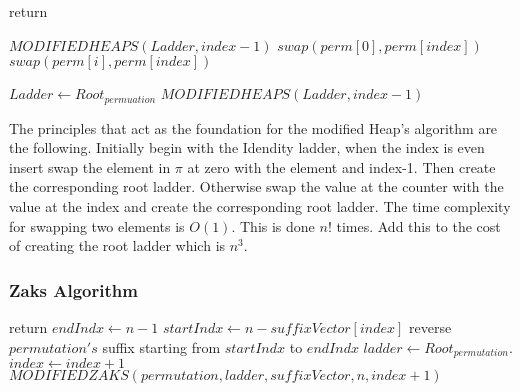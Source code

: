 \begin{algorithm}
  \begin{algorithmic}[1]
        \State return
      \EndIf
        
        $MODIFIEDHEAPS(Ladder, index-1)$
          \State $swap(perm[0], perm[index])$
        \Else 
          \State $swap(perm[i], perm[index])$
          
        \EndIf
        \State $Ladder \gets Root_{permuation}$
      \EndFor
        \State $MODIFIEDHEAPS(Ladder, index-1)$
      \EndIf
    \EndFunction
  \end{algorithmic}
\end{algorithm}
The principles that act as the foundation for the modified Heap's algorithm 
are the following. Initially begin with the Idendity ladder, when the index is 
even insert swap the element in $\pi$ at zero with the element and index-1. Then create the 
corresponding root ladder. Otherwise swap the value at the counter with the value at the 
index and create the corresponding root ladder. The time complexity for swapping two elements 
is $O(1)$. This is done $n!$ times. Add this to the cost of creating the root ladder which is 
$n^{3}$.\pagebreak



\subsubsection{Zaks Algorithm}
\begin{algorithm}
  \begin{algorithmic}[1]
        \State return
      \EndIf
        \State $endIndx \gets n-1$
        \State $startIndx \gets n-suffixVector[index]$
        \State reverse $permutation's$ suffix starting from $startIndx$ to $endIndx$
        \State $ladder \gets Root_{permutation}$.
        \State $index \gets index+1$
        \State$MODIFIEDZAKS(permutation, ladder, suffixVector, n, index+1)$ 


    \EndFunction
  
  
  \end{algorithmic}

\end{algorithm}


